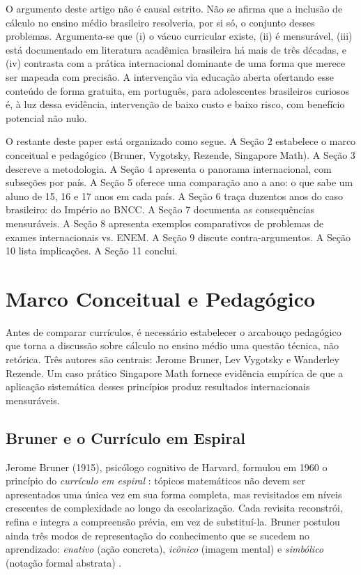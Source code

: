 \documentclass[12pt,a4paper,oneside]{article}
\begin{document}
O argumento deste artigo não é causal estrito. Não se afirma
que a inclusão de cálculo no ensino médio brasileiro resolveria, por
si só, o conjunto desses problemas. Argumenta-se que (i) o vácuo
curricular existe, (ii) é mensurável, (iii) está documentado em
literatura acadêmica brasileira há mais de três décadas, e (iv)
contrasta com a prática internacional dominante de uma forma que
merece ser mapeada com precisão. A intervenção via educação aberta
\textemdash{} ofertando esse conteúdo de forma gratuita, em
português, para adolescentes brasileiros curiosos \textemdash{} é,
à luz dessa evidência, intervenção de baixo custo e baixo risco,
com benefício potencial não nulo.

O restante deste paper está organizado como segue. A Seção 2
estabelece o marco conceitual e pedagógico (Bruner, Vygotsky,
Rezende, Singapore Math). A Seção 3 descreve a metodologia. A
Seção 4 apresenta o panorama internacional, com subseções por
país. A Seção 5 oferece uma comparação ano a ano: o que sabe um
aluno de 15, 16 e 17 anos em cada país. A Seção 6 traça duzentos
anos do caso brasileiro: do Império ao BNCC. A Seção 7 documenta
as consequências mensuráveis. A Seção 8 apresenta exemplos
comparativos de problemas de exames internacionais vs. ENEM. A
Seção 9 discute contra-argumentos. A Seção 10 lista implicações.
A Seção 11 conclui.

\section{Marco Conceitual e Pedagógico}

Antes de comparar currículos, é necessário estabelecer o arcabouço
pedagógico que torna a discussão sobre cálculo no ensino médio uma
questão técnica, não retórica. Três autores são centrais: Jerome
Bruner, Lev Vygotsky e Wanderley Rezende. Um caso prático
\textemdash{} Singapore Math \textemdash{} fornece evidência empírica
de que a aplicação sistemática desses princípios produz resultados
internacionais mensuráveis.

\subsection{Bruner e o Currículo em Espiral}

Jerome Bruner (1915), psicólogo cognitivo de Harvard,
formulou em 1960 o princípio do \emph{currículo em espiral}
\cite{ref:bruner-1960}: tópicos matemáticos não devem ser apresentados
uma única vez em sua forma completa, mas revisitados em níveis
crescentes de complexidade ao longo da escolarização. Cada revisita
reconstrói, refina e integra a compreensão prévia, em vez de
substituí-la. Bruner postulou ainda três modos de representação do
conhecimento que se sucedem no aprendizado: \emph{enativo} (ação
concreta), \emph{icônico} (imagem mental) e \emph{simbólico}
(notação formal abstrata) \cite{ref:bruner-1966}.
\end{document}
